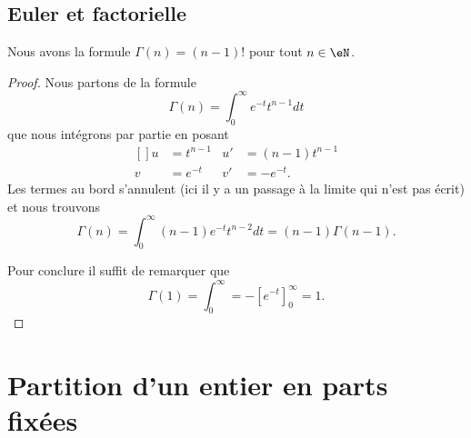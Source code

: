 \subsection{Euler et factorielle}

\begin{proposition}
    Nous avons la formule \( \Gamma(n)=(n-1)!\) pour tout \( n\in \eN\).
\end{proposition}

\begin{proof}
    Nous partons de la formule
    \begin{equation}
        \Gamma(n)=\int_0^{\infty} e^{-t}t^{n-1}dt
    \end{equation}
    que nous intégrons par partie en posant
    \begin{equation}
        \begin{aligned}[]
            u&=t^{n-1}&u'&=(n-1)t^{n-1}\\
            v&= e^{-t}&v'&=- e^{-t}.
        \end{aligned}
    \end{equation}
    Les termes au bord s'annulent (ici il y a un passage à la limite qui n'est pas écrit) et nous trouvons
    \begin{equation}
        \Gamma(n)=\int_0^{\infty}(n-1) e^{-t}t^{n-2}dt=(n-1)\Gamma(n-1).
    \end{equation}

    Pour conclure il suffit de remarquer que
    \begin{equation}
        \Gamma(1)=\int_0^{\infty}=-[ e^{-t}]_0^{\infty}=1.
    \end{equation}
\end{proof}

\section{Partition d'un entier en parts fixées}

